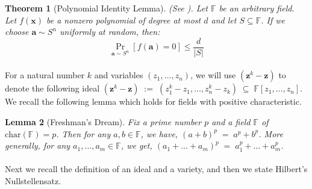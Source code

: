\documentclass[11pt]{article}
\newtheorem{theorem}{Theorem}[section]
\newtheorem{lemma}[theorem]{Lemma}
\newcommand{\set}[1]{\left\{ #1 \right\}}
\newcommand{\setcond}[2]{\left\{ #1 \;\middle\vert\; #2 \right\}}
\newcommand{\F}{\mathbb{F}}
\begin{document}
\begin{theorem}[Polynomial Identity Lemma]\label{lem:ODLSZ}
(See \cite[Lemma 9.2.2]{GuruswamiRudraSudanCodingTheory}).
    Let $\F$ be an arbitrary field. Let $f(\mathbf{x})$ be a nonzero polynomial of degree at most $d$ and let $S \subseteq \F$. If we choose $\mathbf{a} \sim S^n$ uniformly at random, then: $$\Pr_{\mathbf{a}\sim S^n} [f(\mathbf{a}) = 0] \leq \frac{d}{|S|}$$ 
\end{theorem}

\paragraph{}For a natural number $k$ and variables $(z_{1},\ldots,z_{n})$, we will use $(\mathbf{z}^{k} - \mathbf{z})$ to denote the following ideal $(\mathbf{z}^{k} - \mathbf{z}) \; := \; (z_{1}^{k} - z_{1}, \ldots, z_{n}^{k} - z_{k}) \; \subseteq \; \F[z_{1},\ldots,z_{n}]$. We recall the following lemma which holds for fields with positive characteristic.\\

\begin{lemma}[Freshman's Dream]\label{lemma:freshman}
Fix a prime number $p$ and a field $\F$ of $\mathrm{char}(\F) = p$. Then for any $a, b \in \F$, we have, $(a+b)^{p} \; = \; a^{p} + b^{p}$. 
More generally, for any $a_{1},\ldots,a_{m} \in \F$, we get,
$(a_{1}+\ldots+a_{m})^{p} \; = \; a_{1}^{p} + \ldots + a_{m}^{p}$. 
\end{lemma}



\paragraph{}Next we recall the definition of an ideal and a variety, and then we state Hilbert's Nullstellensatz.
\end{document}
